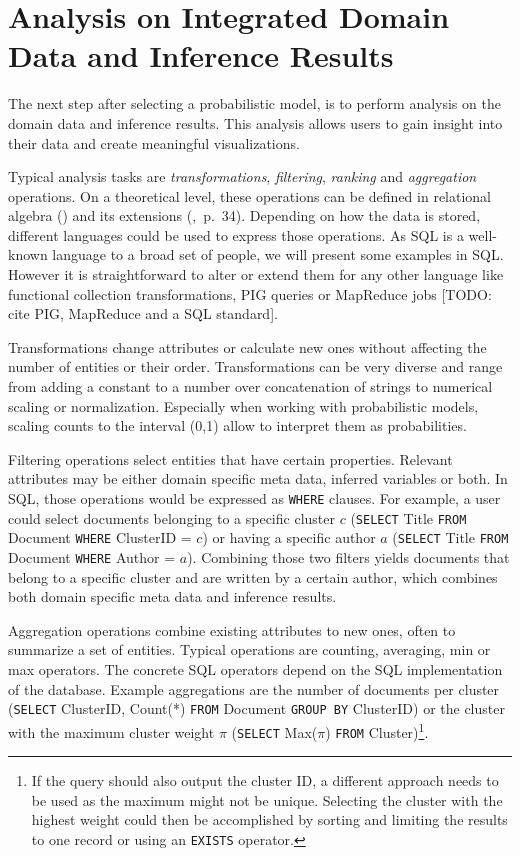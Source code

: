 \section{Analysis on Integrated Domain Data and Inference Results}

The next step after selecting a probabilistic model, is to perform analysis on the domain data and inference results. This analysis allows users to gain insight into their data and create meaningful visualizations.

Typical analysis tasks are \emph{transformations}, \emph{filtering}, \emph{ranking} and \emph{aggregation} operations. On a theoretical level, these operations can be defined in relational algebra (\cite{ozsoyouglu1987extending, klug1982equivalence}) and its extensions (\cite{rajaraman2011mining},~p.~34). Depending on how the data is stored, different languages could be used to express those operations. As SQL is a well-known language to a broad set of people, we will present some examples in SQL. However it is straightforward to alter or extend them for any other language like functional collection transformations, PIG queries or MapReduce jobs [TODO: cite PIG, MapReduce and a SQL standard].

Transformations change attributes or calculate new ones without affecting the number of entities or their order. Transformations can be very diverse and range from adding a constant to a number over concatenation of strings to numerical scaling or normalization. Especially when working with probabilistic models, scaling counts to the interval (0,1) allow to interpret them as probabilities.

Filtering operations select entities that have certain properties. Relevant attributes may be either domain specific meta data, inferred variables or both. In SQL, those operations would be expressed as \texttt{WHERE} clauses. For example, a user could select documents belonging to a specific cluster $c$ (\texttt{SELECT} Title \texttt{FROM} Document \texttt{WHERE} ClusterID = $c$) or having a specific author $a$ (\texttt{SELECT} Title \texttt{FROM} Document \texttt{WHERE} Author = $a$). Combining those two filters yields documents that belong to a specific cluster and are written by a certain author, which combines both domain specific meta data and inference results.

Aggregation operations combine existing attributes to new ones, often to summarize a set of entities. Typical operations are counting, averaging, min or max operators. The concrete SQL operators depend on the SQL implementation of the database. Example aggregations are the number of documents per cluster (\texttt{SELECT} ClusterID, Count(*) \texttt{FROM} Document \texttt{GROUP BY} ClusterID) or the cluster with the maximum cluster weight $\pi$ (\texttt{SELECT} Max($\pi$) \texttt{FROM} Cluster)\footnote{If the query should also output the cluster ID, a different approach needs to be used as the maximum might not be unique. Selecting the cluster with the highest weight could then be accomplished by sorting and limiting the results to one record or using an \texttt{EXISTS} operator.}.


